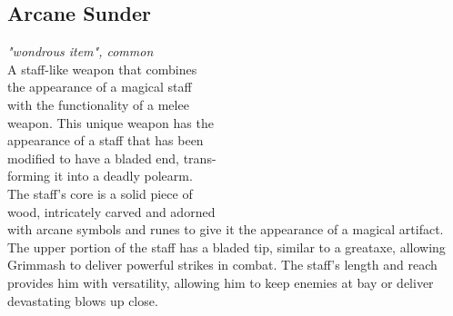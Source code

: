 \documentclass[letterpaper,openany,oneside,twocolumn]{book}
\begin{document}
\subsection*{Arcane Sunder}
\textit{"wondrous item", common}\\
A staff-like weapon that combines\\
the appearance of a magical staff\\
with the functionality of a melee\\
weapon. This unique weapon has the\\
appearance of a staff that has been\\
modified to have a bladed end, trans-\\
forming it into a deadly polearm.\\
The staff's core is a solid piece of\\
wood, intricately carved and adorned\\
with arcane symbols and runes to give it the appearance of a magical artifact. The upper portion of the staff has a bladed tip, similar to a greataxe, allowing Grimmash to deliver powerful strikes in combat. The staff's length and reach provides him with versatility, allowing him to keep enemies at bay or deliver devastating blows up close.
%
\end{document}
